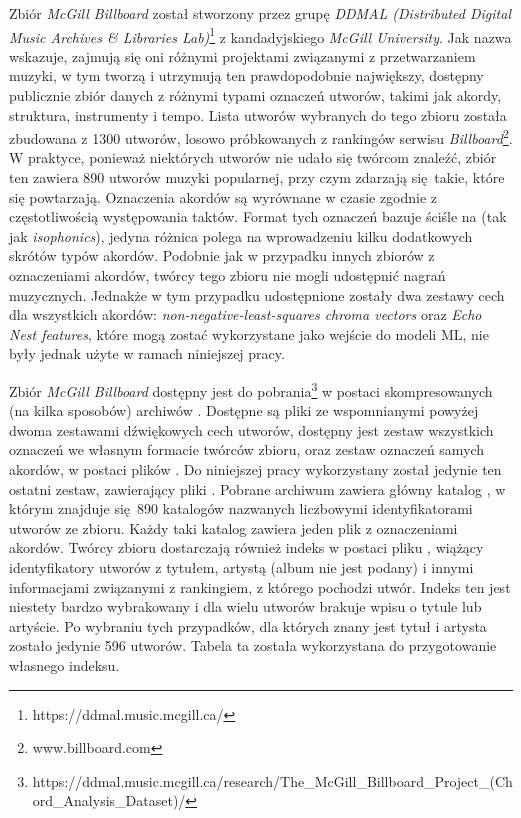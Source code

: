Zbiór \emph{McGill Billboard} \cite{burgoyne_expert_2011} został stworzony przez grupę \emph{DDMAL
(Distributed Digital Music Archives \& Libraries Lab)}\footnote{https://ddmal.music.mcgill.ca/} z
kandadyjskiego \emph{McGill University}. Jak nazwa wskazuje, zajmują się oni różnymi projektami
związanymi z przetwarzaniem muzyki, w tym tworzą i utrzymują ten prawdopodobnie największy, dostępny
publicznie zbiór danych z różnymi typami oznaczeń utworów, takimi jak akordy, struktura, instrumenty
i tempo. Lista utworów wybranych do tego zbioru została zbudowana z 1300 utworów, losowo
próbkowanych z rankingów serwisu \emph{Billboard}\footnote{www.billboard.com}. W praktyce, ponieważ
niektórych utworów nie udało się twórcom znaleźć, zbiór ten zawiera 890 utworów muzyki popularnej,
przy czym zdarzają się takie, które się powtarzają. Oznaczenia akordów są wyrównane w czasie zgodnie
z częstotliwością występowania taktów. Format tych oznaczeń bazuje ściśle na
\cite{harte_towards_nodate} (tak jak \emph{isophonics}), jedyna różnica polega na wprowadzeniu kilku
dodatkowych skrótów typów akordów.  Podobnie jak w przypadku innych zbiorów z oznaczeniami akordów,
twórcy tego zbioru nie mogli udostępnić nagrań muzycznych. Jednakże w tym przypadku udostępnione
zostały dwa zestawy cech dla wszystkich akordów: \emph{non-negative-least-squares chroma vectors}
oraz \emph{Echo Nest features}, które mogą zostać wykorzystane jako wejście do modeli ML, nie były
jednak użyte w ramach niniejszej pracy.

Zbiór \emph{McGill Billboard} dostępny jest do
pobrania\footnote{https://ddmal.music.mcgill.ca/research/The\_McGill\_Billboard\_Project\_(Chord\_Analysis\_Dataset)/}
w postaci skompresowanych (na kilka sposobów) archiwów . Dostępne są pliki ze wspomnianymi
powyżej dwoma zestawami dźwiękowych cech utworów, dostępny jest zestaw wszystkich oznaczeń we
własnym formacie twórców zbioru, oraz zestaw oznaczeń samych akordów, w postaci plików .
Do niniejszej pracy wykorzystany został jedynie ten ostatni zestaw, zawierający pliki . Pobrane
archiwum zawiera główny katalog , w którym znajduje się 890 katalogów nazwanych
liczbowymi identyfikatorami utworów ze zbioru. Każdy taki katalog zawiera jeden plik  z
oznaczeniami akordów. Twórcy zbioru dostarczają również indeks w postaci pliku , wiążący
identyfikatory utworów z tytułem, artystą (album nie jest podany) i innymi informacjami związanymi z
rankingiem, z którego pochodzi utwór. Indeks ten jest niestety bardzo wybrakowany i dla wielu
utworów brakuje wpisu o tytule lub artyście. Po wybraniu tych przypadków, dla których znany jest
tytuł i artysta zostało jedynie 596 utworów. Tabela ta została wykorzystana do przygotowanie
własnego indeksu.

